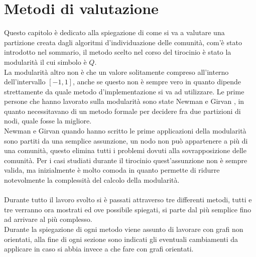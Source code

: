 %
%
\chapter{Metodi di valutazione}
Questo capitolo è dedicato alla spiegazione di come si va a valutare una partizione creata dagli algoritmi d'individuazione delle comunità, com'è stato introdotto nel sommario, il metodo scelto nel corso del tirocinio è stato la modularità il cui simbolo è $Q$.\\
La modularità altro non è che un valore solitamente compreso all'interno dell'intervallo $[-1, 1]$, anche se questo non è sempre vero in quanto dipende strettamente da quale metodo d'implementazione si va ad utilizzare. Le prime persone che hanno lavorato sulla modularità sono state Newman e Girvan , in quanto necessitavano di un metodo formale per decidere fra due partizioni di nodi, quale fosse la migliore.\\
Newman e Girvan  quando hanno scritto le prime applicazioni della modularità sono partiti da una semplice assunzione, un nodo non può appartenere a più di una comunità, questo elimina tutti i problemi dovuti alla sovrapposizione delle comunità. Per i casi studiati durante il tirocinio quest'assunzione non è sempre valida, ma inizialmente è molto comoda in quanto permette di ridurre notevolmente la complessità del calcolo della modularità.\\
\\
Durante tutto il lavoro svolto si è passati attraverso tre differenti metodi, tutti e tre verranno ora mostrati ed ove possibile spiegati, si parte dal più semplice fino ad arrivare al più complesso.\\ Durante la spiegazione di ogni metodo viene assunto di lavorare con grafi non orientati, alla fine di ogni sezione sono indicati gli eventuali cambiamenti da applicare in caso si abbia invece a che fare con grafi orientati.
%
